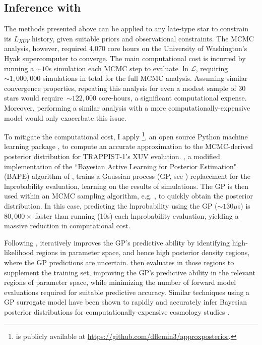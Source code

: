 \subsection{Inference with \approxposterior} \label{trap:sec:methods:approx}

The methods presented above can be applied to any late-type star to constrain its $L_{XUV}$ history, given suitable priors and observational constraints. The MCMC analysis, however, required 4,070 core hours on the University of Washington's Hyak supercomputer to converge. The main computational cost is incurred by running a ${\sim}10$s \vplanet simulation each MCMC step to evaluate $\ln \mathcal{L}$, requiring ${\sim}1,000,000$ simulations in total for the full MCMC analysis. Assuming similar convergence properties, repeating this analysis for even a modest sample of 30 stars would require~${\sim} 122,000$ core-hours, a significant computational expense. Moreover, performing a similar analysis with a more computationally-expensive model would only exacerbate this issue.

To mitigate the computational cost, I apply \approxposterior\footnote{\approxposterior is publicly available at \href{https://github.com/dflemin3/approxposterior}{https://github.com/dflemin3/approxposterior}.}, an open source Python machine learning package \citep{FlemingVanderPlas2018}, to compute an accurate approximation to the \emcee MCMC-derived posterior distribution for TRAPPIST-1's XUV evolution. \approxposterior, a modified implementation of the ``Bayesian Active Learning for Posterior Estimation" (BAPE) algorithm of \citet{Kandasamy2017}, trains a Gaussian process (GP, see \citet{Rasmussen2006}) replacement for the lnprobability evaluation, learning on the results of \vplanet simulations. The GP is then used within an MCMC sampling algorithm, e.g. \emcee, to quickly obtain the posterior distribution. In this case, predicting the lnprobability using the GP (${\sim} 130 \mu$s) is $80,000 \times$ faster than running \vplanet (10s) each lnprobability evaluation, yielding a massive reduction in computational cost.

Following \citet{Kandasamy2017}, \approxposterior iteratively improves the GP's predictive ability by identifying high-likelihood regions in parameter space, and hence high posterior density regions, where the GP predictions are uncertain. \approxposterior then evaluates \vplanet in those regions to supplement the training set, improving the GP's predictive ability in the relevant regions of parameter space, while minimizing the number of forward model evaluations required for suitable predictive accuracy. Similar techniques using a GP surrogate model have been shown to rapidly and accurately infer Bayesian posterior distributions for computationally-expensive cosmology studies \citep[e.g.][]{Bird2019,McClintock2019}. 


